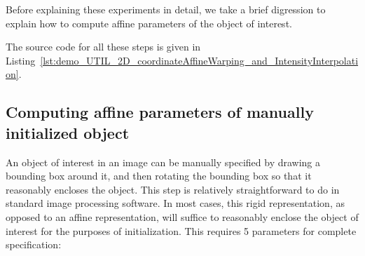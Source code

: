 Before explaining these experiments in detail, we take a brief digression to explain how to compute affine parameters of the object of interest.

The source code for all these steps is given in Listing~\ref{lst:demo_UTIL_2D_coordinateAffineWarping_and_IntensityInterpolation}.

\subsection{Computing affine parameters of manually initialized object}
An object of interest in an image can be manually specified by drawing a bounding box around it, and then rotating the bounding box so that it reasonably encloses the object.  This step is relatively straightforward to do in standard image processing software.  In most cases, this rigid representation, as opposed to an affine representation, will suffice to reasonably enclose the object of interest for the purposes of initialization.  This requires 5 parameters for complete specification:

